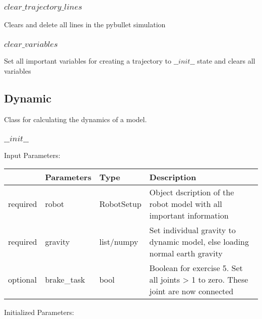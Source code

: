\documentclass[
	ngerman,
	accentcolor=9c,%
	type=intern,
	marginpar=false
	]{tudapub}
\begin{document}
\subsubsection{$clear\_trajectory\_lines$}
\noindent Clears and delete all lines in the pybullet simulation

\vspace{1cm}


\subsubsection{$clear\_variables$}
\noindent Set all important variables for creating a trajectory to $\_\_init\_\_$ state and clears all variables

\vspace{1cm}


\subsection{Dynamic}
\noindent Class for calculating the dynamics of a model.

\vspace{0.5cm}

\subsubsection{$\_\_init\_\_$}
\noindent Input Parameters:
\vspace{0.5cm}


\begin{tabular}{|p{}|p{}|p{}| p{}|}
\hline
 & \textbf{Parameters} & \textbf{Type} & \textbf{Description} \\
\hline
required & robot & RobotSetup & Object dscription of the robot model with all important information \\
\hline
required & gravity & list/numpy & Set individual gravity to dynamic model, else loading normal earth gravity \\
\hline
optional & brake\_task & bool & Boolean for exercise 5. Set all joints > 1 to zero. These joint are now connected \\
\hline
\end{tabular}
\vspace{0.5cm}


\noindent Initialized Parameters:
\end{document}
